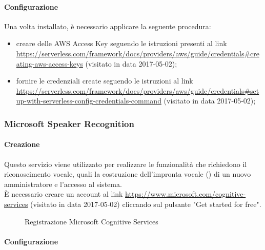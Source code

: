 \paragraph{Configurazione}
Una volta installato, è necessario applicare la seguente procedura:
\begin{itemize}
	\item creare delle AWS Access Key seguendo le istruzioni presenti al link \url{https://serverless.com/framework/docs/providers/aws/guide/credentials#creating-aws-access-keys} (visitato in data 2017-05-02);
	\item fornire le credenziali create seguendo le istruzioni al link \url{https://serverless.com/framework/docs/providers/aws/guide/credentials#setup-with-serverless-config-credentials-command} (visitato in data 2017-05-02);
\end{itemize}

\subsubsection{Microsoft Speaker Recognition}\label{speakerRec}
\paragraph{Creazione}
Questo servizio viene utilizzato per realizzare le funzionalità che richiedono il riconoscimento vocale, quali la costruzione dell'impronta vocale () di un nuovo amministratore e l'accesso al sistema.\\
È necessario creare un account al link \url{https://www.microsoft.com/cognitive-services} (visitato in data 2017-05-02) cliccando sul pulsante "Get started for free".
\begin{figure}[h]
	\caption{Registrazione Microsoft Cognitive Services}
\end{figure}
\paragraph{Configurazione}

